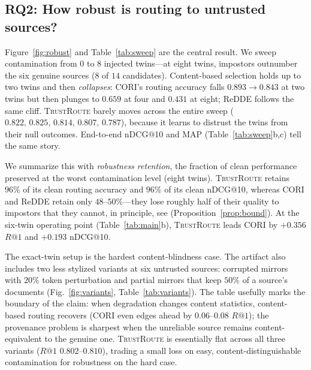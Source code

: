 \documentclass[preprint,12pt]{elsarticle}
\newcommand{\system}{\textsc{TrustRoute}}
\begin{document}
\begin{table}[t]
\centering
\caption{Main results (mean\,$\pm$\,std over seeds $\{7,11,13\}$, budget $b{=}1$).
(a) clean federation; (b) six evil-twin sources.}
\label{tab:main}
\small

\end{table}

\subsection{RQ2: How robust is routing to untrusted sources?}
Figure~\ref{fig:robust} and Table~\ref{tab:sweep} are the central result. We
sweep contamination from $0$ to $8$ injected twins---at eight twins, impostors
outnumber the six genuine sources ($8$ of $14$ candidates). Content-based
selection holds up to two twins and then \emph{collapses}: CORI's routing accuracy
falls $0.893\!\rightarrow\!0.843$ at two twins but then plunges to $0.659$ at four
and $0.431$ at eight; ReDDE follows the same cliff. \system{} barely moves across
the entire sweep ($0.822,\,0.825,\,0.814,\,0.807,\,0.787$), because it learns to
distrust the twins from their null outcomes. End-to-end nDCG@10 and MAP
(Table~\ref{tab:sweep}b,c) tell the same story.

We summarize this with \emph{robustness retention}, the fraction of clean
performance preserved at the worst contamination level (eight twins). \system{}
retains $96\%$ of its clean routing accuracy and $96\%$ of its clean nDCG@10,
whereas CORI and ReDDE retain only $48$--$50\%$---they lose roughly half of their
quality to impostors that they cannot, in principle, see
(Proposition~\ref{prop:bound}). At the six-twin operating point
(Table~\ref{tab:main}b), \system{} leads CORI by $+0.356$ $R@1$ and $+0.193$
nDCG@10.

The exact-twin setup is the hardest content-blindness case. The artifact also
includes two less stylized variants at six untrusted sources: corrupted mirrors
with $20\%$ token perturbation and partial mirrors that keep $50\%$ of a source's
documents (Fig.~\ref{fig:variants}, Table~\ref{tab:variants}). The table usefully
marks the boundary of the claim: when degradation changes content statistics,
content-based routing recovers (CORI even edges ahead by $0.06$--$0.08$ $R@1$);
the provenance problem is sharpest when the unreliable source remains
content-equivalent to the genuine one. \system{} is essentially flat across all
three variants ($R@1$ $0.802$--$0.810$), trading a small loss on easy,
content-distinguishable contamination for robustness on the hard case.
\end{document}
